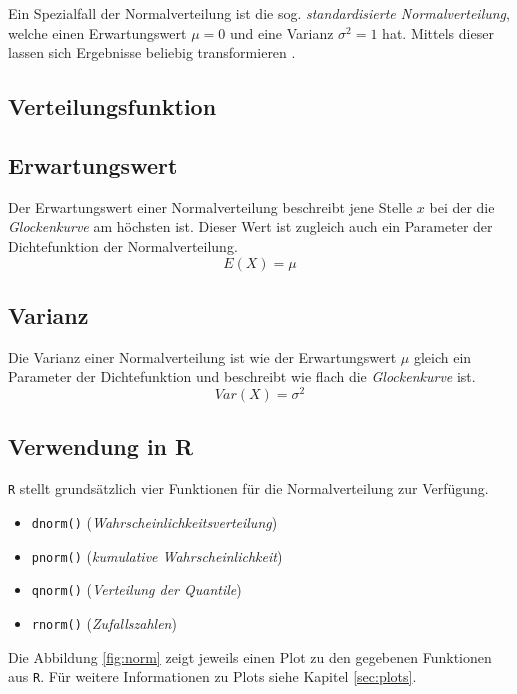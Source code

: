 Ein Spezialfall der Normalverteilung ist die sog.
\emph{standardisierte Normalverteilung}, welche einen 
Erwartungswert $\mu=0$ und eine Varianz $\sigma^2=1$ hat.
Mittels dieser lassen sich Ergebnisse beliebig transformieren
\parencite[298]{henze}.


\subsection{Verteilungsfunktion}

\subsection{Erwartungswert}
Der Erwartungswert einer Normalverteilung beschreibt jene
Stelle $x$ bei der die \emph{Glockenkurve} am höchsten ist.
Dieser Wert ist zugleich auch ein Parameter der Dichtefunktion
der Normalverteilung.
\[  
	E(X) = \mu
\]

\subsection{Varianz}
Die Varianz einer Normalverteilung ist wie der Erwartungswert
$\mu$ gleich ein Parameter der Dichtefunktion und beschreibt
wie flach die \emph{Glockenkurve} ist.
\[  
	Var(X) = \sigma^2
\]

\subsection{Verwendung in R}
\lstinline{R} stellt grundsätzlich vier Funktionen für die 
Normalverteilung zur Verfügung. 
\begin{itemize}
	\item \lstinline{dnorm()} \hfill{} 
		(\emph{Wahrscheinlichkeitsverteilung})
	\item \lstinline{pnorm()} \hfill{}
		(\emph{kumulative Wahrscheinlichkeit})
	\item \lstinline{qnorm()} \hfill{}
		(\emph{Verteilung der Quantile})
	\item \lstinline{rnorm()} \hfill{}
		(\emph{Zufallszahlen})
\end{itemize}
Die Abbildung \ref{fig:norm} zeigt jeweils einen Plot zu den gegebenen
Funktionen aus \lstinline{R}. Für weitere Informationen zu Plots siehe
Kapitel \ref{sec:plots}.





